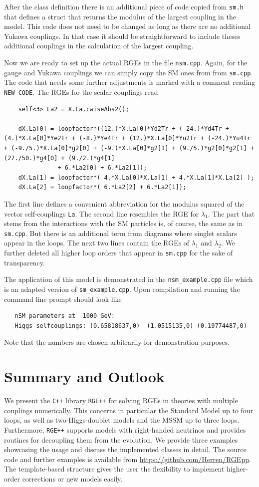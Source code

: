 \documentclass[11pt,a4paper]{article}
\begin{document}
After the class definition there is an additional piece of code copied from \texttt{sm.h} that defines a struct that returns the modulus of the largest coupling in the model. This code does not need to be changed as long as there are no additional Yukawa couplings. In that case it should be straightforward to include theses additional couplings in the calculation of the largest coupling.

Now we are ready to set up the actual RGEs in the file \texttt{nsm.cpp}. Again, for the gauge and Yukawa couplings we can simply copy the SM ones from from \texttt{sm.cpp}. The code that needs some further adjustments is marked with a comment reading \texttt{NEW CODE}. The RGEs for the scalar couplings read
\begin{lstlisting}
    self<3> La2 = X.La.cwiseAbs2();
    
    dX.La[0] = loopfactor*((12.)*X.La[0]*Yd2Tr + (-24.)*Yd4Tr + (4.)*X.La[0]*Ye2Tr + (-8.)*Ye4Tr + (12.)*X.La[0]*Yu2Tr + (-24.)*Yu4Tr + (-9./5.)*X.La[0]*g2[0] + (-9.)*X.La[0]*g2[1] + (9./5.)*g2[0]*g2[1] + (27./50.)*g4[0] + (9./2.)*g4[1]
			   + 6.*La2[0] + 6.*La2[1]);
    dX.La[1] = loopfactor*( 4.*X.La[0]*X.La[1] + 4.*X.La[1]*X.La[2] );
    dX.La[2] = loopfactor*( 6.*La2[2] + 6.*La2[1]);
\end{lstlisting}
The first line defines a convenient abbreviation for the modulus squared of the vector self-couplings \texttt{La}. The second line resembles the RGE for $\lambda_1$. The part that stems from the interactions with the SM particles is, of course, the same as in \texttt{sm.cpp}. But there is an additional term from diagrams where singlet scalars appear in the loops. The next two lines contain the RGEs of $\lambda_1$ and $\lambda_2$. We further deleted all higher loop orders that appear in \texttt{sm.cpp} for the sake of transparency.

The application of this model is demonstrated in the \texttt{nsm\_example.cpp} file which is an adapted version of \texttt{sm\_example.cpp}. Upon compilation and running the command line prompt should look like
\begin{lstlisting}
   nSM parameters at  1000 GeV:
   Higgs selfcouplings: (0.65818637,0)  (1.0515135,0) (0.19774487,0)
\end{lstlisting}
Note that the numbers are chosen arbitrarily for demonstration purposes.

\section{\label{sec::sum}Summary and Outlook}
We present the \texttt{C++} library \texttt{RGE++} for solving RGEs in theories with multiple couplings numerically. This concerns in particular the Standard Model up to four loops, as well as
two-Higgs-doublet models and the MSSM up to three loops. Furthermore, \texttt{RGE++} supports models with right-handed neutrinos and provides routines for decoupling them from the evolution.
We provide three examples showcasing the usage and discuss the implemented classes in detail. The source code and further examples is available from \url{https://github.com/Herren/RGEpp}.
The template-based structure gives the user the flexibility to implement higher-order corrections or new models easily.
\end{document}
